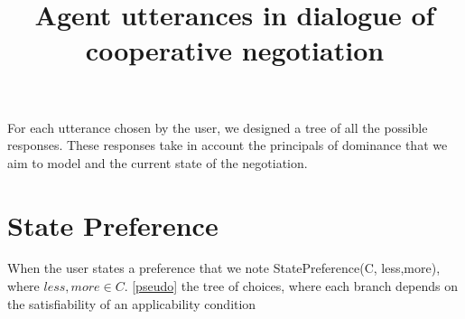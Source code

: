 \documentclass{llncs}
\begin{document}
\title{Agent utterances in dialogue of cooperative negotiation}
\maketitle 

For each utterance chosen by the user, we designed a tree of all the possible responses. These responses take in account the principals of dominance that we aim to model and the current state of the negotiation.

\section{State Preference}
When the user states a preference that we note StatePreference(C, less,more), where $less, more \in C$. \ref{pseudo} the tree of choices, where each branch depends on the satisfiability of an applicability condition
\end{document}
